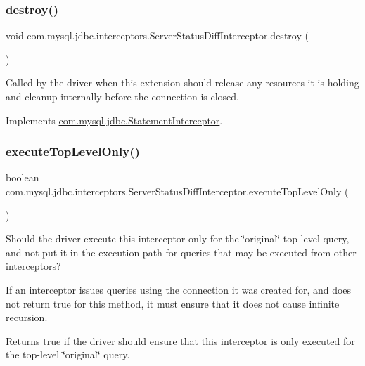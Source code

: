 \subsubsection{\texorpdfstring{destroy()}{destroy()}}
{\footnotesize\ttfamily void com.\+mysql.\+jdbc.\+interceptors.\+Server\+Status\+Diff\+Interceptor.\+destroy (\begin{DoxyParamCaption}{ }\end{DoxyParamCaption})}

Called by the driver when this extension should release any resources it is holding and cleanup internally before the connection is closed. 

Implements \mbox{\hyperlink{interfacecom_1_1mysql_1_1jdbc_1_1_statement_interceptor_a5da9bea29735c87ac10a67c34dcee9ef}{com.\+mysql.\+jdbc.\+Statement\+Interceptor}}.

\mbox{\label{classcom_1_1mysql_1_1jdbc_1_1interceptors_1_1_server_status_diff_interceptor_a3e6b3e52ee87900cec14f20f1b96cdfe}} 
\subsubsection{\texorpdfstring{execute\+Top\+Level\+Only()}{executeTopLevelOnly()}}
{\footnotesize\ttfamily boolean com.\+mysql.\+jdbc.\+interceptors.\+Server\+Status\+Diff\+Interceptor.\+execute\+Top\+Level\+Only (\begin{DoxyParamCaption}{ }\end{DoxyParamCaption})}

Should the driver execute this interceptor only for the \char`\"{}original\char`\"{} top-\/level query, and not put it in the execution path for queries that may be executed from other interceptors?

If an interceptor issues queries using the connection it was created for, and does not return {\ttfamily true} for this method, it must ensure that it does not cause infinite recursion.

\begin{DoxyReturn}{Returns}
true if the driver should ensure that this interceptor is only executed for the top-\/level \char`\"{}original\char`\"{} query. 
\end{DoxyReturn}



